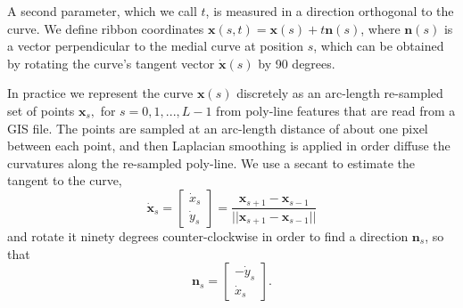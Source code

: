 A second parameter, which we call $t$, is measured in a direction orthogonal to the curve. We define
ribbon coordinates $\mathbf{x}(s, t) = \mathbf{x}(s) + t\mathbf{n}(s)$, where $\mathbf{n}(s)$ is a
vector perpendicular to the medial curve at position $s$, which can be obtained by rotating the
curve's tangent vector $\dot{\mathbf{x}}(s)$ by 90 degrees.


In practice we represent the curve $\mathbf{x}(s)$ discretely as an arc-length re-sampled set of
points $\mathbf{x}_s,$ for $s=0,1,...,L-1$ from poly-line features that are read from a GIS file.
The points are sampled at an arc-length distance of about one pixel between each point, and then
Laplacian smoothing is applied in order diffuse the curvatures along the re-sampled poly-line. We
use a secant to estimate the tangent to the curve,
\[\dot{\mathbf{x}}_s = \left[\begin{array}{c} \dot{x}_s \\ \dot{y}_s \end{array}\right]= \frac{\mathbf{x}_{s+1}-\mathbf{x}_{s-1}}{||\mathbf{x}_{s+1}-\mathbf{x}_{s-1}||} \] and rotate it ninety degrees counter-clockwise in order to find a direction  $\mathbf{n}_s$, so that 
\[\mathbf{n}_s = \left[\begin{array}{c} -\dot{y}_s \\ \dot{x}_s \end{array}\right]. \]

